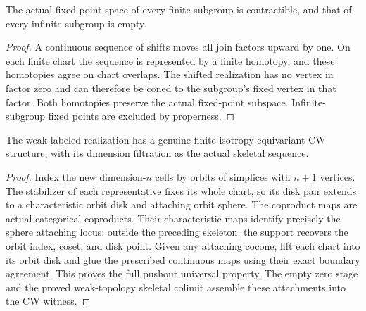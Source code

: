 \begin{proposition}\label{prop:labeled-realization-fixed-criterion}
The actual fixed-point space of every finite subgroup is contractible, and
that of every infinite subgroup is empty.
\end{proposition}
\begin{proof}
\leanok
A continuous sequence of shifts moves all join factors upward by one.
On each finite chart the sequence is represented by a finite homotopy, and
these homotopies agree on chart overlaps. The shifted realization has no
vertex in factor zero and can therefore be coned to the subgroup's fixed
vertex in that factor. Both homotopies preserve the actual fixed-point
subspace. Infinite-subgroup fixed points are excluded by properness.
\end{proof}

\begin{proposition}\label{prop:labeled-realization-genuine-cw}
The weak labeled realization has a genuine finite-isotropy equivariant CW
structure, with its dimension filtration as the actual skeletal sequence.
\end{proposition}
\begin{proof}
\leanok
Index the new dimension-$n$ cells by orbits of simplices with $n+1$ vertices.
The stabilizer of each representative fixes its whole chart, so its disk pair
extends to a characteristic orbit disk and attaching orbit sphere.
The coproduct maps are actual categorical coproducts. Their characteristic
maps identify precisely the sphere attaching locus: outside the preceding
skeleton, the support recovers the orbit index, coset, and disk point.
Given any attaching cocone, lift each chart into its orbit disk and glue the
prescribed continuous maps using their exact boundary agreement. This proves
the full pushout universal property. The empty zero stage and the proved
weak-topology skeletal colimit assemble these attachments into the CW witness.
\end{proof}

